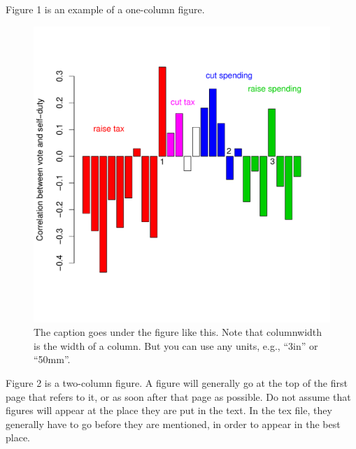 \documentclass[twocolumn]{article}
\begin{document}
Figure 1 is an example of a one-column figure. 

\begin{figure}[t!]
\includegraphics[width=\columnwidth]{dut11.pdf}
\caption{The caption goes under the figure like this. Note that
  columnwidth is the width of a column. But you can use any units,
  e.g., ``3in'' or ``50mm''.}
\end{figure}

Figure 2 is a two-column figure. A figure will generally go at the top of
the first page that refers to it, or as soon after that page as
possible. Do not assume that figures will appear at the place they are
put in the text. In the tex file, they generally have to go before
they are mentioned, in order to appear in the best place.
\end{document}
